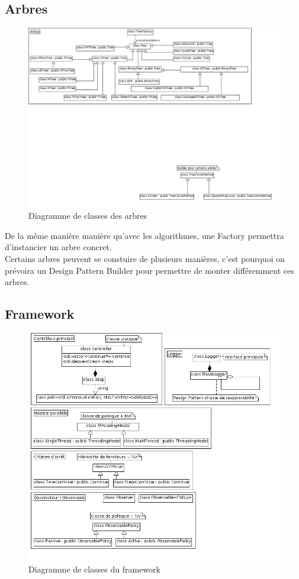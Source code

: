\subsection{Arbres}
\begin{figure}[!h]\centering
   \includegraphics[scale=0.5]{images/c_arbres.png}
   \caption{\label{c_arbre} Diagramme de classes des arbres}
\end{figure}
De la même manière manière qu'avec les algorithmes, une Factory permettra d'instancier un arbre concret.\\
Certains arbres peuvent se constuire de plusieurs manières, c'est pourquoi on prévoira un Design Pattern Builder pour permettre de monter différemment ces arbres.

\subsection{Framework}
\begin{figure}[!h]\centering
   \includegraphics[scale=0.5]{images/c_framework.png}
   \caption{\label{c_framework} Diagramme de classes du framework}
\end{figure}


